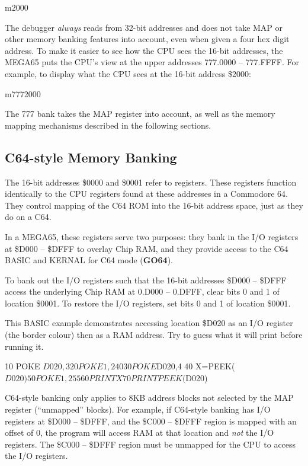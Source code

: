 \begin{basiccode}
m2000
\end{basiccode}

The debugger {\em always} reads from 32-bit addresses and does not take MAP or other memory banking features into account, even when given a four hex digit address. To make it easier to see how the CPU sees the 16-bit addresses, the MEGA65 puts the CPU's view at the upper addresses 777.0000 -- 777.FFFF. For example, to display what the CPU sees at the 16-bit address \$2000:

\begin{basiccode}
m7772000
\end{basiccode}

The 777 bank takes the MAP register into account, as well as the memory mapping mechanisms described in the following sections.

\subsection{C64-style Memory Banking}

The 16-bit addresses \$0000 and \$0001 refer to registers. These registers function identically to the CPU registers found at these addresses in a Commodore 64. They control mapping of the C64 ROM into the 16-bit address space, just as they do on a C64.

In a MEGA65, these registers serve two purposes: they bank in the I/O registers at \$D000 -- \$DFFF to overlay Chip RAM, and they provide access to the C64 BASIC and KERNAL for C64 mode (\textbf{GO64}).

To bank out the I/O registers such that the 16-bit addresses \$D000 -- \$DFFF access the underlying Chip RAM at 0.D000 -- 0.DFFF, clear bits 0 and 1 of location \$0001. To restore the I/O registers, set bits 0 and 1 of location \$0001.

This BASIC example demonstrates accessing location \$D020 as an I/O register
(the border colour) then as a RAM address. Try to guess what it will print
before running it.

\begin{basiccode}
10 POKE $D020,3
20 POKE 1,240
30 POKE $D020,4
40 X=PEEK($D020)
50 POKE 1,255
60 PRINT X
70 PRINT PEEK($D020)
\end{basiccode}

C64-style banking only applies to 8KB address blocks not selected by the MAP register (``unmapped'' blocks). For example, if C64-style banking has I/O registers at \$D000 -- \$DFFF, and the \$C000 -- \$DFFF region is mapped with an offset of 0, the program will access RAM at that location and {\em not} the I/O registers. The \$C000 -- \$DFFF region must be unmapped for the CPU to access the I/O registers.

